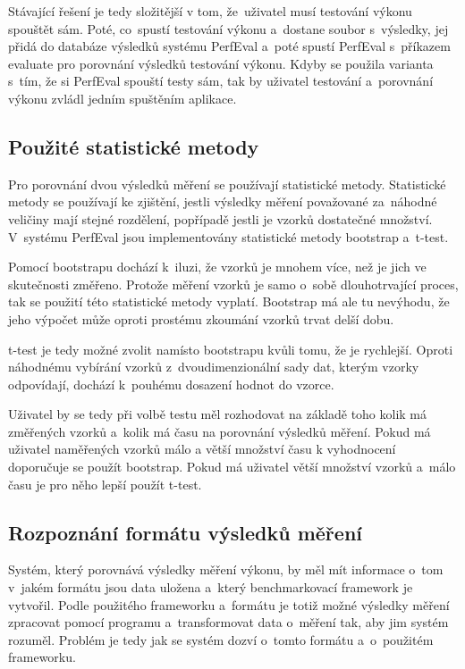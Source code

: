 Stávající řešení je tedy složitější v tom, že~uživatel musí testování výkonu spouštět sám. Poté, co~spustí testování
výkonu a~dostane soubor s~výsledky, jej přidá do databáze výsledků systému PerfEval a~poté spustí PerfEval s~příkazem evaluate
pro porovnání výsledků testování výkonu. Kdyby se použila varianta s~tím, že si PerfEval spouští testy sám, tak
by uživatel testování a~porovnání výkonu zvládl jedním spuštěním aplikace.

\subsection{Použité statistické metody}
Pro porovnání dvou výsledků měření se používají statistické metody. Statistické metody se používají ke zjištění,
jestli výsledky měření považované za~náhodné veličiny mají stejné rozdělení, popřípadě jestli je vzorků dostatečné množství.
V~systému PerfEval jsou implementovány statistické metody bootstrap a~t-test.

Pomocí bootstrapu dochází k~iluzi, že vzorků je mnohem více, než je jich ve skutečnosti změřeno. Protože měření vzorků
je samo o~sobě dlouhotrvající proces, tak se použití této statistické metody vyplatí. Bootstrap má ale tu nevýhodu, že jeho výpočet
může oproti prostému zkoumání vzorků trvat delší dobu.

t-test je tedy možné zvolit namísto bootstrapu kvůli tomu, že je rychlejší. Oproti náhodnému vybírání vzorků z~dvoudimenzionální sady
dat, kterým vzorky odpovídají, dochází k~pouhému dosazení hodnot do vzorce.

Uživatel by se tedy při volbě testu měl rozhodovat na základě toho kolik má změřených vzorků a~kolik má času na porovnání
výsledků měření. Pokud má uživatel naměřených vzorků málo a větší množství času k vyhodnocení doporučuje se použít bootstrap.
Pokud má uživatel větší množství vzorků a~málo času je pro něho lepší použít t-test.

\subsection{Rozpoznání formátu výsledků měření}

Systém, který porovnává výsledky měření výkonu, by měl mít informace o~tom v~jakém formátu jsou data uložena
a~který benchmarkovací framework je vytvořil. Podle použitého frameworku a~formátu je totiž možné výsledky
měření zpracovat pomocí programu a~transformovat data o~měření tak, aby jim systém rozuměl.
Problém je tedy jak se systém dozví o~tomto formátu a~o~použitém frameworku.

